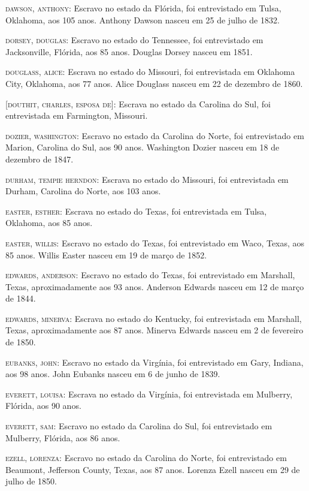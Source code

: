 \begin{Parskip}
\textsc{dawson, anthony:} Escravo no estado da Flórida, foi entrevistado
em Tulsa, Oklahoma, aos 105 anos. Anthony Dawson nasceu em 25 de julho
de 1832.

\textsc{dorsey, douglas:} Escravo no estado do Tennessee, foi
entrevistado em Jacksonville, Flórida, aos 85 anos. Douglas Dorsey
nasceu em 1851.

\textsc{douglass, alice:} Escrava no estado do Missouri, foi
entrevistada em Oklahoma City, Oklahoma, aos 77 anos. Alice Douglass
nasceu em 22 de dezembro de 1860.

\textsc{{[}douthit, charles, esposa de{]}:} Escrava no estado da
Carolina do Sul, foi entrevistada em Farmington, Missouri.

\textsc{dozier, washington:} Escravo no estado da Carolina do Norte, foi
entrevistado em Marion, Carolina do Sul, aos 90 anos. Washington Dozier
nasceu em 18 de dezembro de 1847.

\textsc{durham, tempie herndon:} Escrava no estado do Missouri, foi
entrevistada em Durham, Carolina do Norte, aos 103 anos.

\textsc{easter, esther:} Escrava no estado do Texas, foi entrevistada em
Tulsa, Oklahoma, aos 85 anos.

\textsc{easter, willis:} Escravo no estado do Texas, foi entrevistado em
Waco, Texas, aos 85 anos. Willis Easter nasceu em 19 de março de 1852.

\textsc{edwards, anderson:} Escravo no estado do Texas, foi entrevistado
em Marshall, Texas, aproximadamente aos 93 anos. Anderson Edwards nasceu
em 12 de março de 1844.

\textsc{edwards, minerva:} Escrava no estado do Kentucky, foi
entrevistada em Marshall, Texas, aproximadamente aos 87 anos. Minerva
Edwards nasceu em 2 de fevereiro de 1850.

\textsc{eubanks, john:} Escravo no estado da Virgínia, foi entrevistado
em Gary, Indiana, aos 98 anos. John Eubanks nasceu em 6 de junho de
1839.

\textsc{everett, louisa:} Escrava no estado da Virgínia, foi
entrevistada em Mulberry, Flórida, aos 90 anos.

\textsc{everett, sam:} Escravo no estado da Carolina do Sul, foi
entrevistado em Mulberry, Flórida, aos 86 anos.

\textsc{ezell, lorenza:} Escravo no estado da Carolina do Norte, foi
entrevistado em Beaumont, Jefferson County, Texas, aos 87 anos. Lorenza
Ezell nasceu em 29 de julho de 1850.


\end{Parskip}
